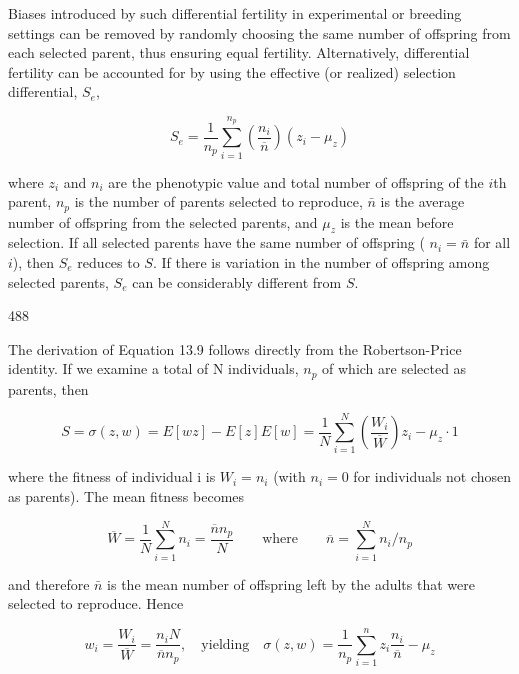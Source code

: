 \documentclass{article}
\begin{document}
Biases introduced by such differential fertility in experimental or breeding settings can be removed by randomly choosing the same number of offspring from each selected parent, thus ensuring equal fertility. Alternatively, differential fertility can be accounted for by using the effective (or realized) selection differential,  $ S_{e} $,

\begin{equation}
S_{e}=\frac{1}{n_{p}}\sum_{i=1}^{n_{p}}\left(\frac{n_{i}}{\overline{n}}\right)(z_{i}-\mu_{z})
\tag{13.9}
\label{eq:13_9}
\end{equation}

where  $ z_i $ and  $ n_i $ are the phenotypic value and total number of offspring of the  $ i $th parent,  $ n_p $ is the number of parents selected to reproduce,  $ \bar{n} $ is the average number of offspring from the selected parents, and  $ \mu_z $ is the mean before selection. If all selected parents have the same number of offspring ( $ n_i = \bar{n} $ for all  $ i $), then  $ S_e $ reduces to  $ S $. If there is variation in the number of offspring among selected parents,  $ S_e $ can be considerably different from  $ S $.

488

The derivation of Equation 13.9 follows directly from the Robertson-Price identity. If we examine a total of N individuals,  $ n_{p} $ of which are selected as parents, then

\begin{equation}
S=\sigma(z,w)=E[w z]-E[z]E[w]=\frac{1}{N}\sum_{i=1}^{N}\left(\frac{W_{i}}{\overline{W}}\right)z_{i}-\mu_{z}\cdot1
\end{equation}

where the fitness of individual i is  $ W_{i} = n_{i} $ (with  $ n_{i} = 0 $ for individuals not chosen as parents). The mean fitness becomes

\begin{equation}
\overline{W}=\frac{1}{N}\sum_{i=1}^{N}n_{i}=\frac{\overline{n}n_{p}}{N}\qquad\mathrm{where}\qquad\overline{n}=\sum_{i=1}^{N}n_{i}/n_{p}
\end{equation}

and therefore  $ \bar{n} $ is the mean number of offspring left by the adults that were selected to reproduce. Hence

\begin{equation}
w_{i}=\frac{W_{i}}{\overline{W}}=\frac{n_{i}N}{\overline{n}n_{p}},\quad\mathrm{yielding}\quad\sigma(z,w)=\frac{1}{n_{p}}\sum_{i=1}^{n}z_{i}\frac{n_{i}}{\overline{n}}-\mu_{z}
\end{equation}
\end{document}
